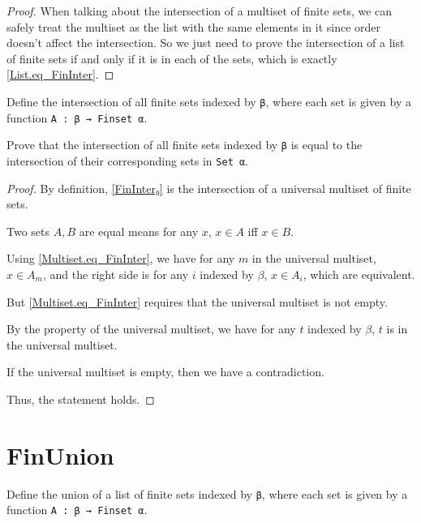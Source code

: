 \begin{proof}
  \leanok
  When talking about the intersection of a multiset of finite sets, we can safely treat the multiset as the list with the same elements in it since order doesn't affect the intersection. So we just need to prove the intersection of a list of finite sets if and only if it is in each of the sets, which is exactly \ref{List.eq_FinInter}.
\end{proof}

\begin{definition}\label{FinInter₀}
  \leanok
  Define the intersection of all finite sets indexed by \verb|β|, where each set is given by a function \verb|A : β → Finset α|.
\end{definition}

\begin{lemma}\label{eq_FinInter₀}
  \leanok
  Prove that the intersection of all finite sets indexed by \verb|β| is equal to the intersection of their corresponding sets in \verb|Set α|.
\end{lemma}

\begin{proof}
  \leanok
  By definition, \ref{FinInter₀} is the intersection of a universal multiset of finite sets.

  Two sets $A,B$ are equal means for any $x$, $x\in A$ iff $x\in B$.

  Using \ref{Multiset.eq_FinInter}, we have for any $m$ in the universal multiset, $x∈A_m$, and the right side is for any $i$ indexed by $β$, $x∈A_i$, which are equivalent.

  But \ref{Multiset.eq_FinInter} requires that the universal multiset is not empty.

  By the property of the universal multiset, we have for any $t$ indexed by $β$, $t$ is in the universal multiset.

  If the universal multiset is empty, then we have a contradiction.

  Thus, the statement holds.
\end{proof}

\section{FinUnion}

\begin{definition}\label{List.FinUnion}
  \leanok
  Define the union of a list of finite sets indexed by \verb|β|, where each set is given by a function \verb|A : β → Finset α|.
\end{definition}

